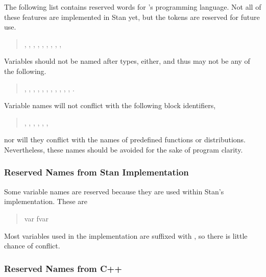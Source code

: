 The following list contains reserved words for \Stan's programming
language.  Not all of these features are implemented in Stan yet, but
the tokens are reserved for future use.
%
\begin{quote}
,
,
,
,
,
,
,
,
, 
\end{quote}
%
Variables should not be named after types, either, and thus may not be
any of the following.
%
\begin{quote}
,
,
,
,
,
,
,
,
,
,
,
.
\end{quote}
%
Variable names will not conflict with the following block identifiers,
%
\begin{quote}
,
,
,
,
, 
,
\end{quote}
%
nor will they conflict with the names of predefined functions or
distributions.  Nevertheless, these names should be avoided for the
sake of program clarity.

\subsubsection{Reserved Names from Stan Implementation}

Some variable names are reserved because they are used within
Stan's \Cpp implementation.  These are
%
\begin{quote}
var
fvar
\end{quote}
%
Most variables used in the implementation are suffixed with
\code{\_\_}, so there is little chance of conflict.

\subsubsection{Reserved Names from C++}

